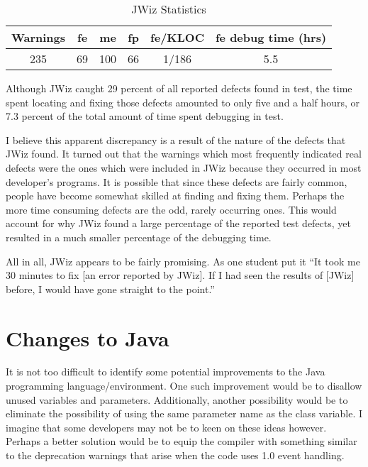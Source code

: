 \begin{table}[htpb]
  \caption{JWiz Statistics}
  \begin{center}
  \begin{tabular}{|c|c|c|c|c|c|}
    \hline Warnings & fe & me & fp & fe/KLOC & fe debug time (hrs)\\ \hline \hline
    235 & 69 & 100 & 66 & 1/186 & 5.5 \\ \hline
   \end{tabular}
  \end{center}
 \label{JWiz Statistics}
\end{table}

Although JWiz caught 29 percent of all reported defects found in test, the
time spent locating and fixing those defects amounted to only five and a
half hours, or 7.3 percent of the total amount of time spent debugging in
test.

I believe this apparent discrepancy is a result of the nature of the
defects that JWiz found.  It turned out that the warnings which most
frequently indicated real defects were the ones which were included in JWiz
because they occurred in most developer's programs.  It is possible that
since these defects are fairly common, people have become somewhat skilled
at finding and fixing them.  Perhaps the more time consuming defects are
the odd, rarely occurring ones.  This would account for why JWiz found a
large percentage of the reported test defects, yet resulted in a much
smaller percentage of the debugging time.

All in all, JWiz appears to be fairly promising.  As one student put it ``It
took me 30 minutes to fix [an error reported by JWiz].  If I had seen the
results of [JWiz] before, I would have gone straight to the point.''

\section{Changes to Java}
It is not too difficult to identify some potential improvements to the Java
programming language/environment.  One such improvement would be to
disallow unused variables and parameters.  Additionally, another
possibility would be to eliminate the possibility of using the same
parameter name as the class variable.  I imagine that some developers may
not be to keen on these ideas however.  Perhaps a better solution would be
to equip the compiler with something similar to the deprecation warnings
that arise when the code uses 1.0 event handling.

